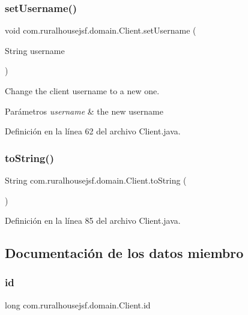 \subsubsection{\texorpdfstring{setUsername()}{setUsername()}}
{\footnotesize\ttfamily void com.\+ruralhousejsf.\+domain.\+Client.\+set\+Username (\begin{DoxyParamCaption}\item[{String}]{username }\end{DoxyParamCaption})}

Change the client username to a new one.


\begin{DoxyParams}{Parámetros}
{\em username} & the new username \\
\hline
\end{DoxyParams}


Definición en la línea 62 del archivo Client.\+java.

\mbox{\label{classcom_1_1ruralhousejsf_1_1domain_1_1_client_a9af93d16608b629f3606f859b0ec85e9}} 
\subsubsection{\texorpdfstring{toString()}{toString()}}
{\footnotesize\ttfamily String com.\+ruralhousejsf.\+domain.\+Client.\+to\+String (\begin{DoxyParamCaption}{ }\end{DoxyParamCaption})}



Definición en la línea 85 del archivo Client.\+java.



\subsection{Documentación de los datos miembro}
\mbox{\label{classcom_1_1ruralhousejsf_1_1domain_1_1_client_ab353a203ee0d84148e34fbb27ff0dbb8}} 
\subsubsection{\texorpdfstring{id}{id}}
{\footnotesize\ttfamily long com.\+ruralhousejsf.\+domain.\+Client.\+id\hspace{0.3cm}{\ttfamily [private]}}




